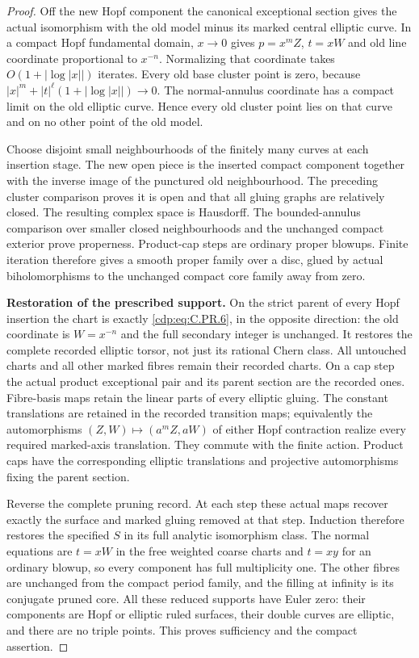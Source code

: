 \begin{proof}
Off the new Hopf component the canonical exceptional section
gives the actual isomorphism with the old model minus its
marked central elliptic curve. In a compact Hopf fundamental
domain, $x\to0$ gives $p=x^mZ$, $t=xW$ and old line coordinate
proportional to $x^{-n}$. Normalizing that coordinate takes
$O(1+|\log|x||)$ iterates. Every old base cluster point is zero,
because
$|x|^m+|t|^\ell(1+|\log|x||)\to0$.
The normal-annulus coordinate has a compact limit on the old
elliptic curve. Hence every old cluster point lies on that
curve and on no other point of the old model.

Choose disjoint small neighbourhoods of the finitely many
curves at each insertion stage. The new open piece is the
inserted compact component together with the inverse image
of the punctured old neighbourhood. The preceding cluster
comparison proves it is open and that all gluing graphs are
relatively closed. The resulting complex space is Hausdorff.
The bounded-annulus comparison over smaller closed
neighbourhoods and the unchanged compact exterior prove
properness. Product-cap steps are ordinary proper blowups.
Finite iteration therefore gives a smooth proper family over
a disc, glued by actual biholomorphisms to the unchanged
compact core family away from zero.

\par\medskip\noindent\textbf{Restoration of the prescribed support.}
On the strict parent of every Hopf insertion the chart is
exactly \eqref{cdp:eq:C.PR.6}, in the opposite direction: the old coordinate
is $W=x^{-n}$ and the full secondary integer is unchanged.
It restores the complete recorded elliptic torsor, not just
its rational Chern class. All untouched charts and all
other marked fibres remain their recorded charts. On a cap
step the actual product exceptional pair and its parent
section are the recorded ones. Fibre-basis maps retain
the linear parts of every elliptic gluing. The constant
translations are retained in the recorded transition maps;
equivalently the automorphisms
$(Z,W)\mapsto(a^mZ,aW)$ of either Hopf contraction realize
every required marked-axis translation. They commute with
the finite action. Product caps have the corresponding
elliptic translations and projective automorphisms fixing
the parent section.

Reverse the complete pruning record. At each step these
actual maps recover exactly the surface and marked gluing
removed at that step. Induction therefore restores the
specified $S$ in its full analytic isomorphism class.
The normal equations are $t=xW$ in the free weighted
coarse charts and $t=xy$ for an ordinary blowup, so every
component has full multiplicity one. The other fibres
are unchanged from the compact period family, and the
filling at infinity is its conjugate pruned core.
All these reduced supports have Euler zero: their
components are Hopf or elliptic ruled surfaces, their
double curves are elliptic, and there are no triple points.
This proves sufficiency and the compact assertion.


\end{proof}
